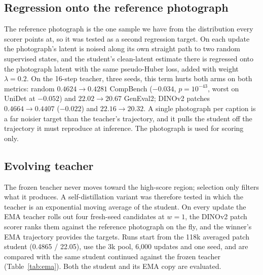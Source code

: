 \documentclass[11pt,a4paper]{article}
\begin{document}
\subsection{Regression onto the reference photograph}
The reference photograph is the one sample we have from the distribution every scorer points at, so it was tested as a second regression target. On each update the photograph's latent is noised along its own straight path to two random supervised states, and the student's clean-latent estimate there is regressed onto the photograph latent with the same pseudo-Huber loss, added with weight $\lambda=0.2$. On the 16-step teacher, three seeds, this term hurts both arms on both metrics: random $0.4624\to0.4281$ CompBench ($-0.034$, $p=10^{-43}$, worst on UniDet at $-0.052$) and $22.02\to20.67$ GenEval2; DINOv2 patches $0.4664\to0.4407$ ($-0.022$) and $22.16\to20.32$. A single photograph per caption is a far noisier target than the teacher's trajectory, and it pulls the student off the trajectory it must reproduce at inference. The photograph is used for scoring only.

\subsection{Evolving teacher}
\label{sec:ema}
The frozen teacher never moves toward the high-score region; selection only filters what it produces. A self-distillation variant was therefore tested in which the teacher is an exponential moving average of the student. On every update the EMA teacher rolls out four fresh-seed candidates at $w=1$, the DINOv2 patch scorer ranks them against the reference photograph on the fly, and the winner's EMA trajectory provides the targets. Runs start from the 118k averaged patch student (0.4865 / 22.05), use the 3k pool, 6,000 updates and one seed, and are compared with the same student continued against the frozen teacher (Table~\ref{tab:ema}). Both the student and its EMA copy are evaluated.
\end{document}
